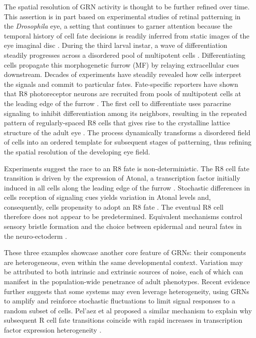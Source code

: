 The spatial resolution of GRN activity is thought to be further refined over time. This assertion is in part based on experimental studies of retinal patterning in the \textit{Drosophila} eye, a setting that continues to garner attention because the temporal history of cell fate decisions is readily inferred from static images of the eye imaginal disc \cite{Pelaez2015}. During the third larval instar, a wave of differentiation steadily progresses across a disordered pool of multipotent cells \cite{Ready1976,Tomlinson1987}. Differentiating cells propagate this morphogenetic furrow (MF) by relaying extracellular cues downstream. Decades of experiments have steadily revealed how cells interpret the signals and commit to particular fates. Fate-specific reporters have shown that R8 photoreceptor neurons are recruited from pools of multipotent cells at the leading edge of the furrow \cite{Jarman1994,}. The first cell to differentiate uses paracrine signaling to inhibit differentiation among its neighbors, resulting in the repeated pattern of regularly-spaced R8 cells that gives rise to the crystalline lattice structure of the adult eye \cite{Frankfort2002}. The process dynamically transforms a disordered field of cells into an ordered template for subsequent stages of patterning, thus refining the spatial resolution of the developing eye field.

Experiments suggest the race to an R8 fate is non-deterministic. The R8 cell fate transition is driven by the expression of Atonal, a transcription factor initially induced in all cells along the leading edge of the furrow \cite{Jarman1994,Baker1997,Hsiung2002}. Stochastic differences in cells reception of signaling cues yields variation in Atonal levels and, consequently, cells propensity to adopt an R8 fate \cite{Baker1990,Gavish2016}. The eventual R8 cell therefore does not appear to be predetermined. Equivalent mechanisms control sensory bristle formation and the choice between epidermal and neural fates in the neuro-ectoderm \cite{Ghysen1993,Simpson1997}.

These three examples showcase another core feature of GRNs: their components are heterogeneous, even within the same developmental context. Variation may be attributed to both intrinsic and extrinsic sources of noise, each of which can manifest in the population-wide penetrance of adult phenotypes. Recent evidence further suggests that some systems may even leverage heterogeneity, using GRNs to amplify and reinforce stochastic fluctuations to limit signal responses to a random subset of cells. Pel'{a}ez et al proposed a similar mechanism to explain why subsequent R cell fate transitions coincide with rapid increases in transcription factor expression heterogeneity \cite{Pelaez2015}.

